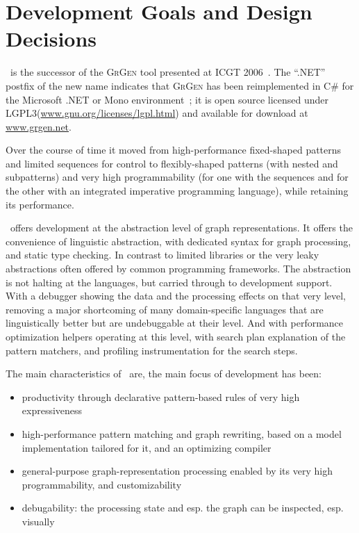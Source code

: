 \chapter{Development Goals and Design Decisions}\label{chp:designgoals}

\GrG~is the successor of the \textsc{GrGen} tool presented at ICGT 2006~\cite{GBGHS:06}.
The ``.NET'' postfix of the new name indicates that \textsc{GrGen} has been reimplemented in C\# for the Microsoft .NET or Mono environment~\cite{NET,MONO};
it is open source licensed under LGPL3(\url{www.gnu.org/licenses/lgpl.html}) and available for download at \url{www.grgen.net}.

Over the course of time it moved from high-performance fixed-shaped patterns and limited sequences for control to flexibly-shaped patterns (with nested and subpatterns) and very high programmability (for one with the sequences and for the other with an integrated imperative programming language), while retaining its performance.

\GrG\ offers development at the abstraction level of graph representations.
It offers the convenience of linguistic abstraction, with dedicated syntax for graph processing, and static type checking.
In contrast to limited libraries or the very leaky abstractions often offered by common programming frameworks.
The abstraction is not halting at the languages, but carried through to development support.
With a debugger showing the data and the processing effects on that very level,
removing a major shortcoming of many domain-specific languages that are linguistically better but are undebuggable at their level.
And with performance optimization helpers operating at this level, with search plan explanation of the pattern matchers, and profiling instrumentation for the search steps.

The main characteristics of \GrG\ are, the main focus of development has been:
\begin{itemize}
	\item productivity through declarative pattern-based rules of very high expressiveness
	\item high-performance pattern matching and graph rewriting, based on a model implementation tailored for it, and an optimizing compiler
	\item general-purpose graph-representation processing enabled by its very high programmability, and customizability
	\item debugability: the processing state and esp. the graph can be inspected, esp. visually
\end{itemize}

